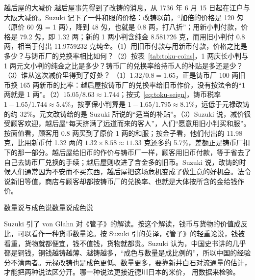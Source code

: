 \begin{example}{越后屋的大减价}\label{ex:toku-genbun}
越后屋事先得到了改铸的消息，从 1736 年 6 月 15 日起在江户与大阪大减价。Suzuki 记下了一件和服的价格：改铸以前，“加倍的价格是 120 匁（原价 60 匁 = 1 两），降到 48 匁，也就是 0.8 两，打八折”；用新小判付款，价格是 79.2 匁，即 1.32 两；新的 1 两小判含纯金 8.581726 克，而用旧小判付 0.8 两，相当于付出 11.9759232 克纯金\cite{suzuki2021}。（1）用旧币付款与用新币付款，价格之比是多少？与铸币厂的兑换率相比如何？（2）按表~\ref{tab:toku-coins}，1 两庆长小判与 1 两元文小判的纯金之比是多少？铸币厂的兑换率给持币人的补贴是多还是少？（3）谁从这次减价里得到了好处？
\solution （1）$1.32/0.8=1.65$，正是铸币厂 100 两旧币换 165 两新币的比率：越后屋按铸币厂的兑换率给旧币作价，没有按法令的“1 两就是 1 两”。（2）$15.05/8.63\approx1.744$；按式~\eqref{eq:toku-seign}，铸币税率 $1-1.65/1.744\approx5.4\%$，按享保小判算是 $1-1.65/1.795\approx8.1\%$，远低于元禄改铸的约 32\%。元文改铸给的是 Suzuki 所说的“适当的补贴”。（3）Suzuki 说，减价很受顾客欢迎，越后屋“每天挤满了远道而来的客人”，人们“愿意用旧小判买和服”\cite{suzuki2021}。按面值看，顾客用 0.8 两买到了原价 1 两的和服；按金子看，他们付出的 11.98 克，比用新币付 1.32 两的 $1.32\times8.58\approx11.33$ 克还多约 5.7\%，差额正是铸币厂扣下的那一部分。越后屋给旧币的作价与铸币厂一样，顾客用旧币付款，等于省去了自己去铸币厂兑换的手续；越后屋则收进了含金多的旧币。Suzuki 说，改铸的时候人们通常因为不安而不买东西，越后屋把这场危机变成了做生意的好机会\cite{suzuki2021}。法令说新旧等值，商店与顾客却都按铸币厂的兑换率、也就是大体按所含的金给钱作价。
\end{example}

\begin{compare}{数量说与成色说}{数量说}{成色说}
\end{compare}

Suzuki 引了 von Glahn 对《管子》的解读。按这个解读，钱币与货物的价值成反比，可以看作一种货币数量论。按 Suzuki 引的英译，《管子》的轻重论说，钱被看重，货物就都便宜，钱不值钱，货物就都贵\cite{suzuki2021}。Suzuki 认为，中国史书讲的几乎都是铜钱，铜钱越铸越薄、越铸越多，“成色与数量是成比例的”，所以中国的经验分不清两者。元禄改铸也是成色更低、数量更多，要靠新井白石对流通量的估计，才能把两种说法区分开\cite{suzuki2021}。哪一种说法更接近德川日本的米价， 用数据来检验。

